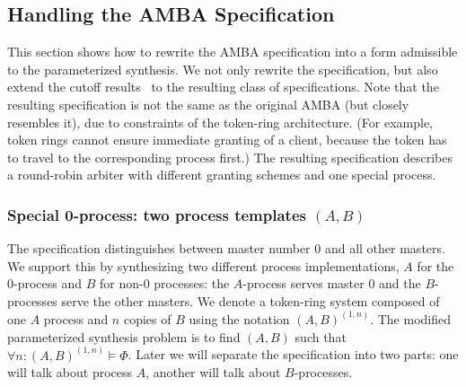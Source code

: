 
%

\subsection{Handling the AMBA Specification}\label{amba:sec:handling-amba}

  This section shows how to rewrite the AMBA specification into a form
  admissible to the parameterized synthesis.
  We not only rewrite the specification,
  but also extend the cutoff results~\cite{Emerso03} to the resulting class of specifications.
  Note that the resulting specification is not the same as the original AMBA (but closely resembles it),
  due to constraints of the token-ring architecture.
  (For example, token rings cannot ensure immediate granting of a client,
   because the token has to travel to the corresponding process first.)
  The resulting specification describes a round-robin arbiter
  with different granting schemes and one special process.


\subsubsection{Special 0-process: two process templates $(A,B)$}

  The specification distinguishes between master number 0 and all other masters.
  We support this by synthesizing two different process implementations,
  $A$ for the 0-process and $B$ for non-0 processes:
  the $A$-process serves master 0 and the $B$-processes serve the other masters.
  We denote a token-ring system composed of one $A$ process and $n$ copies of $B$
  using the notation $(A,B)^{(1,n)}$.
  The modified parameterized synthesis problem is to find $(A,B)$ such that
  $\forall n: (A,B)^{(1,n)} \models \Phi$.
  Later we will separate the specification into two parts:
  one will talk about process $A$, another will talk about $B$-processes.

